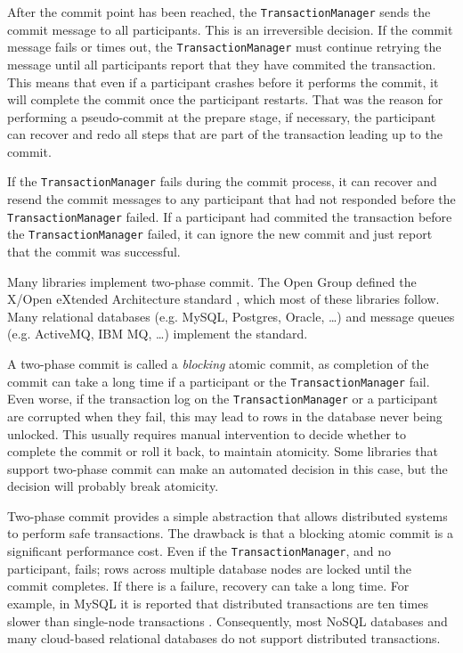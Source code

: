 After the commit point has been reached, the \texttt{TransactionManager} sends the commit message to all participants.
This is an irreversible decision.
If the commit message fails or times out, the \texttt{TransactionManager} must continue retrying the message
until all participants report that they have commited the transaction.
This means that even if a participant crashes before it performs the commit, it will complete the commit once the participant restarts.
That was the reason for performing a pseudo-commit at the prepare stage,
if necessary, the participant can recover and redo all steps that are part of the transaction leading up to the commit.

If the \texttt{TransactionManager} fails during the commit process,
it can recover and resend the commit messages to any participant that had not responded before the \texttt{TransactionManager} failed.
If a participant had commited the transaction before the \texttt{TransactionManager} failed,
it can ignore the new commit and just report that the commit was successful.

Many libraries implement two-phase commit.
The Open Group defined the X/Open eXtended Architecture standard \cite{xa-std}, which most of these libraries follow.
Many relational databases (e.g. MySQL, Postgres, Oracle, \dots) and message queues (e.g. ActiveMQ, IBM MQ, \dots)
implement the standard.

A two-phase commit is called a \emph{blocking} atomic commit,
as completion of the commit can take a long time if a participant or the \texttt{TransactionManager} fail.
Even worse, if the transaction log on the \texttt{TransactionManager} or a participant are corrupted when they fail,
this may lead to rows in the database never being unlocked.
This usually requires manual intervention to decide whether to complete the commit or roll it back, to maintain atomicity.
Some libraries that support two-phase commit can make an automated decision in this case,
but the decision will probably break atomicity.

Two-phase commit provides a simple abstraction that allows distributed systems to perform safe transactions.
The drawback is that a blocking atomic commit is a significant performance cost.
Even if the \texttt{TransactionManager}, and no participant, fails;
rows across multiple database nodes are locked until the commit completes.
If there is a failure, recovery can take a long time.
For example, in MySQL it is reported that distributed transactions are ten times slower than single-node transactions \cite{distrib-mysql}.
Consequently, most NoSQL databases and many cloud-based relational databases do not support distributed transactions.

